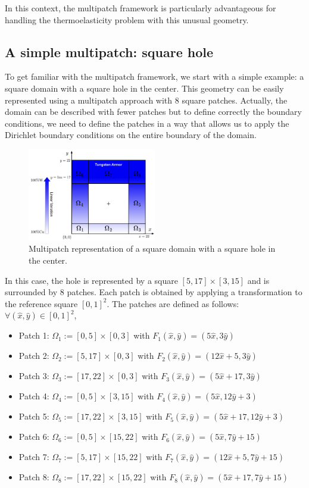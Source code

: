 \documentclass[a4paper,12pt,twoside]{report}
\begin{document}
In this context, the multipatch framework is particularly advantageous for handling the thermoelasticity problem with this unusual geometry. 

\subsection{A simple multipatch: square hole}

To get familiar with the multipatch framework, we start with a simple example: a square domain with a square hole in the center. This geometry can be easily represented using a multipatch approach with 8 square patches. Actually, the domain can be described with fewer patches but to define correctly the boundary conditions, we need to define the patches in a way that allows us to apply the Dirichlet boundary conditions on the entire boundary of the domain.

\begin{figure}[!h]
	\centering
	\includegraphics[width=0.5\textwidth]{figures/square_hole.png}
	\caption{Multipatch representation of a square domain with a square hole in the center.}
\end{figure}

In this case, the hole is represented by a square $[5,17] \times [3,15]$ and is surrounded by 8 patches. Each patch is obtained by applying a transformation to the reference square $[0,1]^2$. The patches are defined as follows: $\forall (\hat x, \hat y) \in [0,1]^2$,
\begin{itemize}
	\item Patch 1: $\Omega_1 := [0,5] \times [0,3]$ with $F_1(\hat x, \hat y) = (5\hat x, 3\hat y)$
	\item Patch 2: $\Omega_2 := [5,17] \times [0,3]$ with $F_2(\hat x, \hat y) = (12\hat x + 5, 3\hat y)$
	\item Patch 3: $\Omega_3 := [17,22] \times [0,3]$ with $F_3(\hat x, \hat y) = (5\hat x + 17, 3\hat y)$
	\item Patch 4: $\Omega_4 := [0,5] \times [3,15]$ with $F_4(\hat x, \hat y) = (5\hat x, 12\hat y + 3)$
	\item Patch 5: $\Omega_5 := [17,22] \times [3,15]$ with $F_5(\hat x, \hat y) = (5\hat x + 17, 12\hat y + 3)$
	\item Patch 6: $\Omega_6 := [0,5] \times [15,22]$ with $F_6(\hat x, \hat y) = (5\hat x, 7\hat y + 15)$
	\item Patch 7: $\Omega_7 := [5,17] \times [15,22]$ with $F_7(\hat x, \hat y) = (12\hat x + 5, 7\hat y + 15)$
	\item Patch 8: $\Omega_8 := [17,22] \times [15,22]$ with $F_8(\hat x, \hat y) = (5\hat x + 17, 7\hat y + 15)$
\end{itemize}
\end{document}
